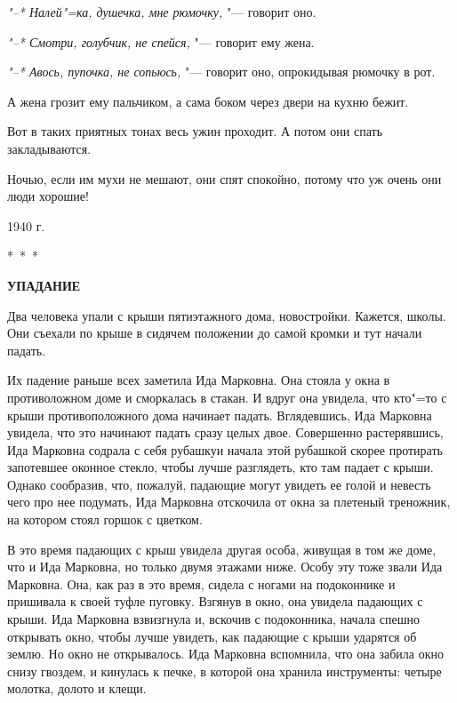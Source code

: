 \documentclass[12pt]{extarticle}
\begin{document}
\textit{"--* Налей"=ка, душечка, мне  рюмочку,} "--- говорит оно.
    
\textit{"--* Смотри, голубчик, не спейся,} "--- говорит
ему жена.
    
\textit{"--* Авось, пупочка,  не сопьюсь,} "--- говорит
оно, опрокидывая рюмочку в рот.
    
А жена  грозит ему пальчиком, а сама боком 
через двери на кухню бежит.
    
Вот в  таких  приятных тонах  весь  ужин
проходит. А потом они спать закладываются.
    
Ночью,  если им мухи не мешают, они спят
спокойно, потому что уж очень они люди хорошие!

\begin{flushright}
1940 г.
\end{flushright}

\begin{center}
\vspace{0.1cm}
\large
*~*~*

\vspace{0.3cm}
\bf
УПАДАНИЕ
\end{center}

\rm

Два  человека упали с крыши пятиэтажного
дома, новостройки. Кажется, школы.  Они съехали 
по крыше в  сидячем  положении до самой
кромки и тут начали падать.
    
Их падение раньше всех заметила Ида Марковна. 
Она стояла у окна в противоложном доме 
и сморкалась в стакан. И вдруг она увидела, 
что кто"=то с крыши противоположного дома
начинает падать. Вглядевшись,  Ида  Марковна
увидела, что это начинают падать сразу целых
двое. Совершенно растерявшись,  Ида Марковна
содрала с себя рубашкуи начала этой рубашкой
скорее  протирать запотевшее оконное стекло,
чтобы  лучше  разглядеть,  кто  там падает с
крыши.  Однако сообразив,  что, пожалуй, падающие 
могут увидеть ее голой и невесть чего
про нее подумать,  Ида Марковна отскочила от
окна за плетеный треножник, на котором стоял
горшок с цветком.

В это время падающих с крыш увидела другая 
особа, живущая в том же доме,  что и Ида
Марковна, но только двумя этажами ниже. Особу 
эту тоже звали Ида Марковна. Она, как раз
в это время, сидела с ногами на  подоконнике
и пришивала к своей туфле пуговку. Взгянув в
окно, она увидела падающих с крыши. Ида Марковна  
взвизгнула и,  вскочив с подоконника,
начала  спешно открывать окно,  чтобы  лучше
увидеть,  как  падающие с крыши  ударятся об
землю. Но окно не открывалось.  Ида Марковна
вспомнила, что  она  забила окно снизу гвоздем,  
и кинулась к печке, в которой она хранила
инструменты: четыре молотка,  долото  и
клещи.
    
\end{document}
